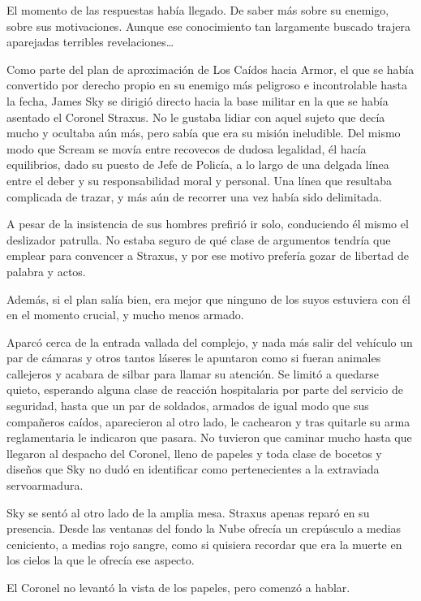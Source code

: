 El momento de las respuestas había llegado. De saber más sobre su enemigo, sobre sus motivaciones. Aunque ese conocimiento tan largamente buscado trajera aparejadas terribles revelaciones\dots

\fancyparbreak
Como parte del plan de aproximación de Los Caídos hacia Armor, el que se había convertido por derecho propio en su enemigo más peligroso e incontrolable hasta la fecha, James Sky se dirigió directo hacia la base militar en la que se había asentado el Coronel Straxus. No le gustaba lidiar con aquel sujeto que decía mucho y ocultaba aún más, pero sabía que era su misión ineludible. Del mismo modo que Scream se movía entre recovecos de dudosa legalidad, él hacía equilibrios, dado su puesto de Jefe de Policía, a lo largo de una delgada línea entre el deber y su responsabilidad moral y personal. Una línea que resultaba complicada de trazar, y más aún de recorrer una vez había sido delimitada.

A pesar de la insistencia de sus hombres prefirió ir solo, conduciendo él mismo el deslizador patrulla. No estaba seguro de qué clase de argumentos tendría que emplear para convencer a Straxus, y por ese motivo prefería gozar de libertad de palabra y actos.

Además, si el plan salía bien, era mejor que ninguno de los suyos estuviera con él en el momento crucial, y mucho menos armado.

Aparcó cerca de la entrada vallada del complejo, y nada más salir del vehículo un par de cámaras y otros tantos láseres le apuntaron como si fueran animales callejeros y acabara de silbar para llamar su atención. Se limitó a quedarse quieto, esperando alguna clase de reacción hospitalaria por parte del servicio de seguridad, hasta que un par de soldados, armados de igual modo que sus compañeros caídos, aparecieron al otro lado, le cachearon y tras quitarle su arma reglamentaria le indicaron que pasara. No tuvieron que caminar mucho hasta que llegaron al despacho del Coronel, lleno de papeles y toda clase de bocetos y diseños que Sky no dudó en identificar como pertenecientes a la extraviada servoarmadura.

Sky se sentó al otro lado de la amplia mesa. Straxus apenas reparó en su presencia. Desde las ventanas del fondo la Nube ofrecía un crepúsculo a medias ceniciento, a medias rojo sangre, como si quisiera recordar que era la muerte en los cielos la que le ofrecía ese aspecto.

El Coronel no levantó la vista de los papeles, pero comenzó a hablar.

